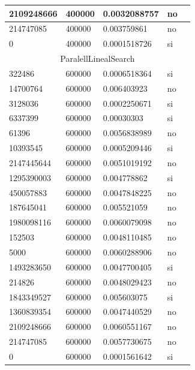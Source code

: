 \documentclass[12pt, fleqn]{article}                             %
\theoremstyle{break}                                            %
\begin{document}
\begin{longtable}{|m{5em}|m{5em}|m{10em}|m{5em}|@{}m{0pt}@{}}
            2109248666& 400000  & 0.0032088757 & no &\\[1em]    \hline
            214747085& 400000  & 0.003759861 & no &\\[1em]    \hline
            0& 400000  & 0.0001518726 & si &\\[1em]    \hline
            \multicolumn{5}{|c|}{ParalellLinealSearch}   \\          \hline
            322486& 600000  & 0.0006518364 & si &\\[1em]    \hline
            14700764& 600000  & 0.006403923 & no &\\[1em]    \hline
            3128036& 600000  & 0.0002250671 & si &\\[1em]    \hline
            6337399& 600000  & 0.00030303 & si &\\[1em]    \hline
            61396& 600000  & 0.0056838989 & no &\\[1em]    \hline
            10393545& 600000  & 0.0005209446 & si &\\[1em]    \hline
            2147445644& 600000  & 0.0051019192 & no &\\[1em]    \hline
            1295390003& 600000  & 0.004778862 & si &\\[1em]    \hline
            450057883& 600000  & 0.0047848225 & no &\\[1em]    \hline
            187645041& 600000  & 0.005521059 & no &\\[1em]    \hline
            1980098116& 600000  & 0.0060079098 & no &\\[1em]    \hline
            152503& 600000  & 0.0048110485 & no &\\[1em]    \hline
            5000& 600000  & 0.0060288906 & no &\\[1em]    \hline
            1493283650& 600000  & 0.0047700405 & si &\\[1em]    \hline
            214826& 600000  & 0.0048029423 & no &\\[1em]    \hline
            1843349527& 600000  & 0.005603075 & si &\\[1em]    \hline
            1360839354& 600000  & 0.0047440529 & no &\\[1em]    \hline
            2109248666& 600000  & 0.0060551167 & no &\\[1em]    \hline
            214747085& 600000  & 0.0057730675 & no &\\[1em]    \hline
            0& 600000  & 0.0001561642 & si &\\[1em]    \hline

\end{longtable}
\end{document}
